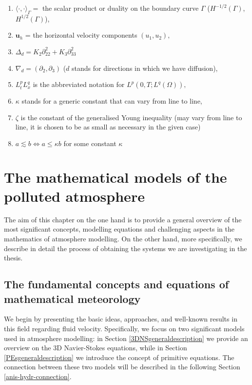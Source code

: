 \documentclass[12pt]{report}
\numberwithin{theorem}{chapter}
\numberwithin{corollary}{chapter}
\numberwithin{lemma}{chapter}
\numberwithin{remark}{chapter}
\numberwithin{definition}{chapter}
\numberwithin{prop}{chapter}
\begin{document}
\begin{enumerate}
\item $\langle \cdot,\cdot \rangle_{\Gamma} = $ the scalar product or duality on the boundary curve $\Gamma$ ($H^{-1/2}(\Gamma)$, $H^{1/2}(\Gamma)$),
\item $\mathbf{u}_h$ = the horizontal velocity components $(u_1, u_2),$
\item $\Delta_d = K_2 \partial_{22}^2 + K_3 \partial_{33}^2$
\item $\nabla_d = (\partial_2, \partial_3)$ ($d$ stands for directions in which we have diffusion),
\item $L^p_t L^q_x$ is the abbreviated notation for $L^p (0, T; L^q(\Omega)),$
\item $\kappa$ stands for a generic constant that can vary from line to line,
\item $\zeta$ is the constant of the generalised Young inequality (may vary from line to line, it is chosen to be as small as necessary in the given case)
\item $a \lesssim b \Leftrightarrow a \leq \kappa b$ for some constant $\kappa$

\end{enumerate}

\chapter{The mathematical models of the polluted atmosphere} \label{state_of_art_and_models}

The aim of this chapter on the one hand is to provide a general overview of the most significant concepts, modelling equations and challenging aspects in the mathematics of atmosphere modelling. On the other hand, more specifically, we describe in detail the process of obtaining the systems we are investigating in the thesis.

\section{The fundamental concepts and equations of mathematical meteorology} \label{state_of_art_foundations_section}

We begin by presenting the basic ideas, approaches, and well-known results in this field regarding fluid velocity. Specifically, we focus on two significant models used in atmosphere modelling: in Section \ref{3DNSgeneraldescription} we provide an overview on the 3D Navier-Stokes equations, while in Section \ref{PEsgeneraldescription} we introduce the concept of primitive equations. The connection between these two models will be described in the following Section \ref{anis-hydr-connection}.
\end{document}
